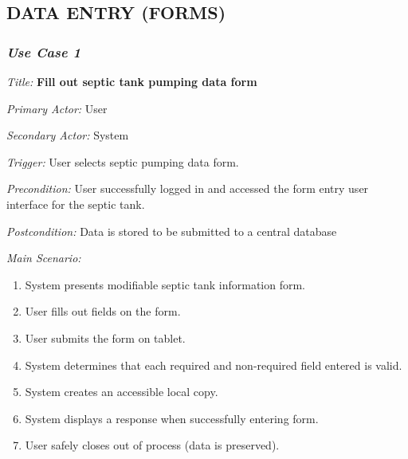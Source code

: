 \documentclass[twoside,letterpaper]{article}
\begin{document}
\subsection[DATA ENTRY (FORMS)]{\rmfamily\bfseries\color{black}
DATA ENTRY (FORMS)}

\subsubsection{\textit{Use Case 1}}

\textit{Title: }{\bfseries\color{black} Fill out septic tank pumping data form}

{\color{black} \textit{Primary Actor:} User}

{\color{black} \textit{Secondary Actor:} System}

{\color{black} \textit{Trigger:} User selects septic pumping data form.}

{\color{black} \textit{Precondition:} User  successfully logged in and accessed the form entry user interface for the septic tank.}

{\color{black} \textit{Postcondition:}  Data is stored to be submitted to a central database}
\newline

{\color{black} \textit{Main Scenario:}}
\begin{enumerate}
\item System presents modifiable septic tank information form.

\item User fills out fields on the form.

\item User submits the form on tablet.

\item System determines that each required and non-required field entered is valid.

\item System creates an accessible local copy.

\item System displays a response when successfully entering form.

\item User safely closes out of process (data is preserved).
\end{enumerate}
\end{document}
